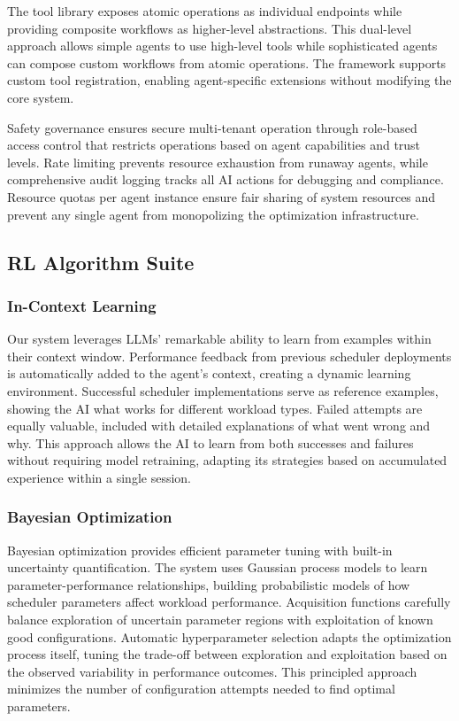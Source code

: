 The tool library exposes atomic operations as individual endpoints while providing composite workflows as higher-level abstractions. This dual-level approach allows simple agents to use high-level tools while sophisticated agents can compose custom workflows from atomic operations. The framework supports custom tool registration, enabling agent-specific extensions without modifying the core system.

Safety governance ensures secure multi-tenant operation through role-based access control that restricts operations based on agent capabilities and trust levels. Rate limiting prevents resource exhaustion from runaway agents, while comprehensive audit logging tracks all AI actions for debugging and compliance. Resource quotas per agent instance ensure fair sharing of system resources and prevent any single agent from monopolizing the optimization infrastructure.

\subsection{RL Algorithm Suite}

\subsubsection{In-Context Learning}
Our system leverages LLMs' remarkable ability to learn from examples within their context window. Performance feedback from previous scheduler deployments is automatically added to the agent's context, creating a dynamic learning environment. Successful scheduler implementations serve as reference examples, showing the AI what works for different workload types. Failed attempts are equally valuable, included with detailed explanations of what went wrong and why. This approach allows the AI to learn from both successes and failures without requiring model retraining, adapting its strategies based on accumulated experience within a single session.

\subsubsection{Bayesian Optimization}
Bayesian optimization provides efficient parameter tuning with built-in uncertainty quantification. The system uses Gaussian process models to learn parameter-performance relationships, building probabilistic models of how scheduler parameters affect workload performance. Acquisition functions carefully balance exploration of uncertain parameter regions with exploitation of known good configurations. Automatic hyperparameter selection adapts the optimization process itself, tuning the trade-off between exploration and exploitation based on the observed variability in performance outcomes. This principled approach minimizes the number of configuration attempts needed to find optimal parameters.

